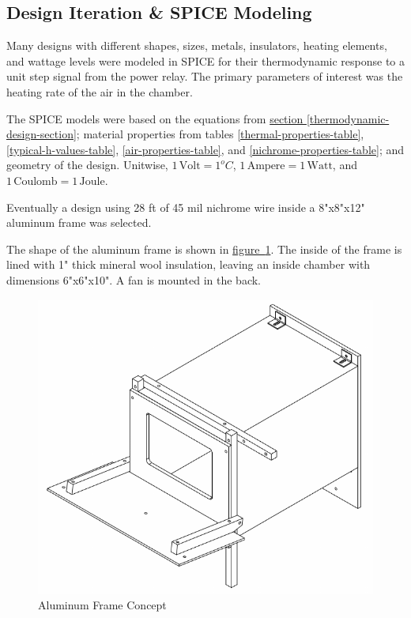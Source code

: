 \documentclass[10pt, twocolumn]{article}
\begin{document}
\subsection{Design Iteration \& SPICE Modeling}

Many designs with different shapes, sizes, metals, insulators,
heating elements, and wattage levels were modeled in SPICE for their
thermodynamic response to a unit step signal from the power relay.
The primary parameters of interest was the heating rate of the air
in the chamber.

The SPICE models were based on the equations from
\hyperref[thermodynamic-design-section]{section \ref{thermodynamic-design-section}};
material properties from tables \ref{thermal-properties-table}, \ref{typical-h-values-table},
\ref{air-properties-table}, and \ref{nichrome-properties-table}; and
geometry of the design.
Unitwise, $1\,\textrm{Volt}=1^{o}C$, $1\,\textrm{Ampere}=1\,\textrm{Watt}$,
\mbox{and $1\,\textrm{Coulomb}=1\,\textrm{Joule}$.}

Eventually a design using 28 ft of 45 mil nichrome wire inside a 8"x8"x12"
aluminum frame was selected.

The shape of the aluminum frame is shown in
\mbox{\hyperref[aluminum-frame-concept]{figure \ref{aluminum-frame-concept}}}.
The inside of the frame is lined with 1" thick mineral wool insulation,
leaving an inside chamber with dimensions 6"x6"x10".
A fan is mounted in the back.

\begin{figure}
	\centering
	\includegraphics[width=\columnwidth]{Figures/aluminum-frame-concept.pdf}
	\caption{Aluminum Frame Concept}
	\label{aluminum-frame-concept}
\end{figure}
\end{document}

